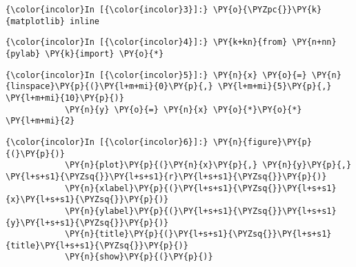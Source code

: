 \begin{Verbatim}[commandchars=\\\{\}]
    {\color{incolor}In [{\color{incolor}3}]:} \PY{o}{\PYZpc{}}\PY{k}{matplotlib} inline 
    \end{Verbatim}
    
        \begin{Verbatim}[commandchars=\\\{\}]
    {\color{incolor}In [{\color{incolor}4}]:} \PY{k+kn}{from} \PY{n+nn}{pylab} \PY{k}{import} \PY{o}{*}
    \end{Verbatim}
    
        \begin{Verbatim}[commandchars=\\\{\}]
    {\color{incolor}In [{\color{incolor}5}]:} \PY{n}{x} \PY{o}{=} \PY{n}{linspace}\PY{p}{(}\PY{l+m+mi}{0}\PY{p}{,} \PY{l+m+mi}{5}\PY{p}{,} \PY{l+m+mi}{10}\PY{p}{)}
            \PY{n}{y} \PY{o}{=} \PY{n}{x} \PY{o}{*}\PY{o}{*} \PY{l+m+mi}{2}
    \end{Verbatim}
    
        \begin{Verbatim}[commandchars=\\\{\}]
    {\color{incolor}In [{\color{incolor}6}]:} \PY{n}{figure}\PY{p}{(}\PY{p}{)}
            \PY{n}{plot}\PY{p}{(}\PY{n}{x}\PY{p}{,} \PY{n}{y}\PY{p}{,} \PY{l+s+s1}{\PYZsq{}}\PY{l+s+s1}{r}\PY{l+s+s1}{\PYZsq{}}\PY{p}{)}
            \PY{n}{xlabel}\PY{p}{(}\PY{l+s+s1}{\PYZsq{}}\PY{l+s+s1}{x}\PY{l+s+s1}{\PYZsq{}}\PY{p}{)}
            \PY{n}{ylabel}\PY{p}{(}\PY{l+s+s1}{\PYZsq{}}\PY{l+s+s1}{y}\PY{l+s+s1}{\PYZsq{}}\PY{p}{)}
            \PY{n}{title}\PY{p}{(}\PY{l+s+s1}{\PYZsq{}}\PY{l+s+s1}{title}\PY{l+s+s1}{\PYZsq{}}\PY{p}{)}
            \PY{n}{show}\PY{p}{(}\PY{p}{)}
    \end{Verbatim}
    
        \begin{center}
        \end{center}
        { \hspace*{\fill} \\}